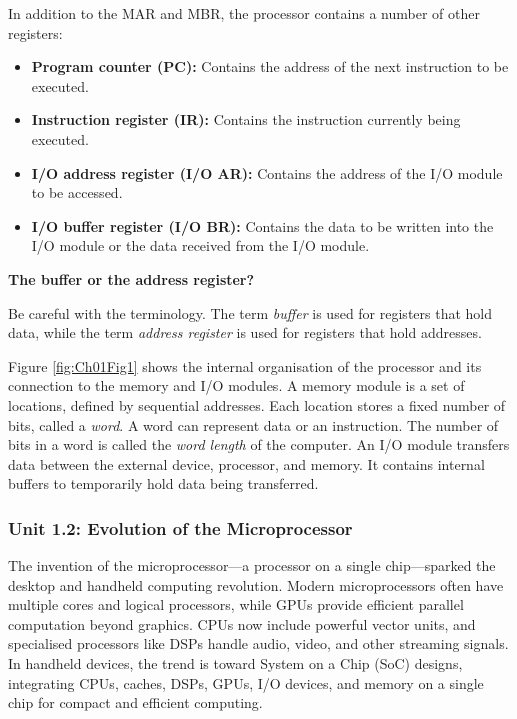\documentclass{article}
\begin{document}
In addition to the MAR and MBR, the processor contains a number of other registers:
\begin{itemize}
    \item \textbf{Program counter (PC):} Contains the address of the next instruction to be executed.
    \item \textbf{Instruction register (IR):} Contains the instruction currently being executed.
    \item \textbf{I/O address register (I/O AR):} Contains the address of the I/O module to be accessed.
    \item \textbf{I/O buffer register (I/O BR):} Contains the data to be written into the I/O module or the data received from the I/O module.
\end{itemize}

\begin{notebox}
    \textbf{The buffer or the address register?}

    Be careful with the terminology. The term \textit{buffer} is used for registers that hold data, while the term \textit{address register} is used for registers that hold addresses.
\end{notebox}

Figure \ref{fig:Ch01Fig1} shows the internal organisation of the processor and its connection to the memory and I/O modules.
A memory module is a set of locations, defined by sequential addresses. Each location stores a fixed number of bits, called a \textit{word}.
A word can represent data or an instruction. The number of bits in a word is called the \textit{word length} of the computer.
An I/O module transfers data between the external device, processor, and memory. It contains internal buffers to temporarily hold data being transferred.

\subsubsection*{Unit 1.2: Evolution of the Microprocessor}
{}

The invention of the microprocessor—a processor on a single chip—sparked the desktop and handheld computing revolution. 
Modern microprocessors often have multiple cores and logical processors, while GPUs provide efficient parallel computation beyond graphics. 
CPUs now include powerful vector units, and specialised processors like DSPs handle audio, video, and other streaming signals. 
In handheld devices, the trend is toward System on a Chip (SoC) designs, integrating CPUs, caches, DSPs, GPUs, I/O devices, and memory on a
single chip for compact and efficient computing.
\end{document}
